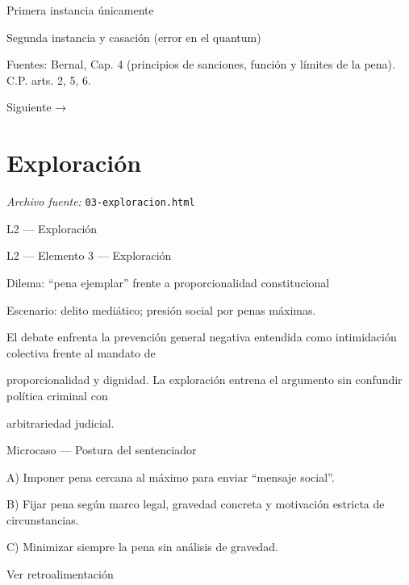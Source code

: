 \documentclass[11pt,a4paper]{article}
\begin{document}
      Primera instancia únicamente\par
      Segunda instancia y casación (error en el quantum)\par





      Fuentes: Bernal, Cap. 4 (principios de sanciones, función y límites de la pena). C.P. arts. 2, 5, 6.\par


    Siguiente →\par

\section{Exploraci\'on}
\noindent\textit{Archivo fuente:} \texttt{03-exploracion.html}

L2 — Exploración\par





    L2 — Elemento 3 — Exploración\par
    Dilema: “pena ejemplar” frente a proporcionalidad constitucional\par

    Escenario: delito mediático; presión social por penas máximas.\par


      El debate enfrenta la prevención general negativa entendida como intimidación colectiva frente al mandato de\par
      proporcionalidad y dignidad. La exploración entrena el argumento sin confundir política criminal con\par
      arbitrariedad judicial.\par



      Microcaso — Postura del sentenciador\par

       A) Imponer pena cercana al máximo para enviar “mensaje social”.\par
       B) Fijar pena según marco legal, gravedad concreta y motivación estricta de circunstancias.\par
       C) Minimizar siempre la pena sin análisis de gravedad.\par
      Ver retroalimentación\par
\end{document}
